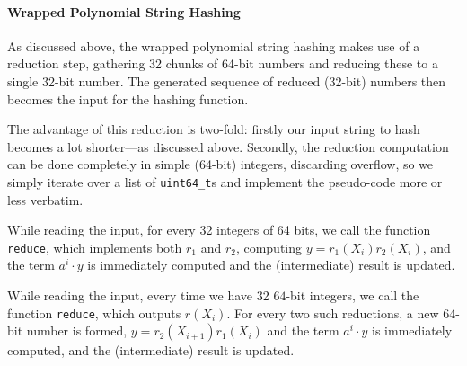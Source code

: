 \documentclass[]{article}
\newcommand{\funk}[1]{\small\texttt{#1}}
\begin{document}
\paragraph{Wrapped Polynomial String Hashing}

As discussed above, the wrapped polynomial string hashing makes use of a
reduction step, gathering 32 chunks of 64-bit numbers and reducing these to a
single 32-bit number. The generated sequence of reduced (32-bit) numbers then
becomes the input for the hashing function.

The advantage of this reduction is two-fold: firstly our input string to hash
becomes a lot shorter---as discussed above. Secondly, the reduction computation
can be done completely in simple (64-bit) integers, discarding overflow, so we
simply iterate over a list of \funk{uint64\_t}s and implement the pseudo-code more or less verbatim.

While reading the input, for every 32 integers of 64 bits, we call the function
\funk{reduce}, which implements both $r_1$ and $r_2$, computing $y =
r_1(X_i)r_2(X_i)$, and the term $a^i \cdot y$ is immediately computed and the (intermediate) result is updated.

While reading the input, every time we have 32 $64$-bit integers, we call the function \funk{reduce}, which outputs $r(X_i)$. For every two such reductions, a new 64-bit number is formed, $y = r_2(X_{i+1})r_1(X_i)$ and the term $a^i \cdot y$ is immediately computed, and the (intermediate) result is updated.





\end{document}
